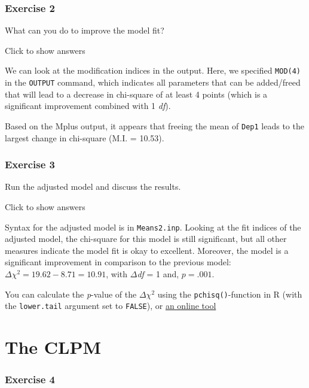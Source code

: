 \documentclass[
]{book}
\begin{document}
\hypertarget{exercise-2}{%
\subsubsection*{Exercise 2}\label{exercise-2}}

What can you do to improve the model fit?

Click to show answers

We can look at the modification indices in the output. Here, we specified \texttt{MOD(4)} in the \texttt{OUTPUT} command, which indicates all parameters that can be added/freed that will lead to a decrease in chi-square of at least 4 points (which is a significant improvement combined with 1 \emph{df}).

Based on the Mplus output, it appears that freeing the mean of \texttt{Dep1} leads to the largest change in chi-square (M.I. = 10.53).

\hypertarget{exercise-3}{%
\subsubsection*{Exercise 3}\label{exercise-3}}

Run the adjusted model and discuss the results.

Click to show answers

Syntax for the adjusted model is in \texttt{Means2.inp}. Looking at the fit indices of the adjusted model, the chi-square for this model is still significant, but all other measures indicate the model fit is okay to excellent. Moreover, the model is a significant improvement in comparison to the previous model: \(\Delta\chi^{2} = 19.62 - 8.71 = 10.91\), with \(\Delta\)\emph{df} = 1 and, \(p = .001\).

You can calculate the \emph{p}-value of the \(\Delta \chi^{2}\) using the \texttt{pchisq()}-function in R (with the \texttt{lower.tail} argument set to \texttt{FALSE}), or \href{http://www.fourmilab.ch/rpkp/experiments/analysis/chiCalc.html}{an online tool}

\hypertarget{the-clpm}{%
\section*{The CLPM}\label{the-clpm}}

\hypertarget{exercise-4}{%
\subsubsection*{Exercise 4}\label{exercise-4}}
\end{document}
